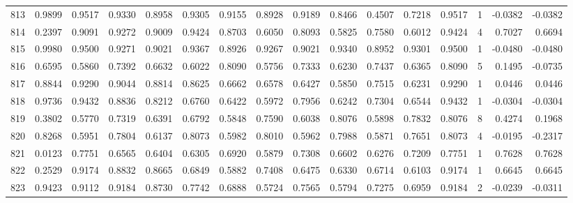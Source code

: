 \begin{tabular}{lrrrrrrrrrrrrrrr}
813 &      0.9899 &  0.9517 &  0.9330 &  0.8958 &  0.9305 &  0.9155 &  0.8928 &  0.9189 &  0.8466 &  0.4507 &   0.7218 &     0.9517 &      1 &                   -0.0382 &                    -0.0382 \\
814 &      0.2397 &  0.9091 &  0.9272 &  0.9009 &  0.9424 &  0.8703 &  0.6050 &  0.8093 &  0.5825 &  0.7580 &   0.6012 &     0.9424 &      4 &                    0.7027 &                     0.6694 \\
815 &      0.9980 &  0.9500 &  0.9271 &  0.9021 &  0.9367 &  0.8926 &  0.9267 &  0.9021 &  0.9340 &  0.8952 &   0.9301 &     0.9500 &      1 &                   -0.0480 &                    -0.0480 \\
816 &      0.6595 &  0.5860 &  0.7392 &  0.6632 &  0.6022 &  0.8090 &  0.5756 &  0.7333 &  0.6230 &  0.7437 &   0.6365 &     0.8090 &      5 &                    0.1495 &                    -0.0735 \\
817 &      0.8844 &  0.9290 &  0.9044 &  0.8814 &  0.8625 &  0.6662 &  0.6578 &  0.6427 &  0.5850 &  0.7515 &   0.6231 &     0.9290 &      1 &                    0.0446 &                     0.0446 \\
818 &      0.9736 &  0.9432 &  0.8836 &  0.8212 &  0.6760 &  0.6422 &  0.5972 &  0.7956 &  0.6242 &  0.7304 &   0.6544 &     0.9432 &      1 &                   -0.0304 &                    -0.0304 \\
819 &      0.3802 &  0.5770 &  0.7319 &  0.6391 &  0.6792 &  0.5848 &  0.7590 &  0.6038 &  0.8076 &  0.5898 &   0.7832 &     0.8076 &      8 &                    0.4274 &                     0.1968 \\
820 &      0.8268 &  0.5951 &  0.7804 &  0.6137 &  0.8073 &  0.5982 &  0.8010 &  0.5962 &  0.7988 &  0.5871 &   0.7651 &     0.8073 &      4 &                   -0.0195 &                    -0.2317 \\
821 &      0.0123 &  0.7751 &  0.6565 &  0.6404 &  0.6305 &  0.6920 &  0.5879 &  0.7308 &  0.6602 &  0.6276 &   0.7209 &     0.7751 &      1 &                    0.7628 &                     0.7628 \\
822 &      0.2529 &  0.9174 &  0.8832 &  0.8665 &  0.6849 &  0.5882 &  0.7408 &  0.6475 &  0.6330 &  0.6714 &   0.6103 &     0.9174 &      1 &                    0.6645 &                     0.6645 \\
823 &      0.9423 &  0.9112 &  0.9184 &  0.8730 &  0.7742 &  0.6888 &  0.5724 &  0.7565 &  0.5794 &  0.7275 &   0.6959 &     0.9184 &      2 &                   -0.0239 &                    -0.0311 \\

\end{tabular}
